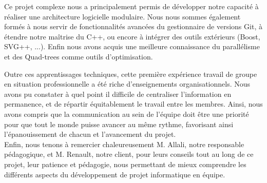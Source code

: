 \documentclass{style}
\begin{document}
Ce projet complexe nous a principalement permis de développer notre capacité à réaliser une architecture logicielle modulaire. Nous nous sommes également formés à nous servir de fonctionnalités avancées du gestionnaire de versions Git, à étendre notre maîtrise du C++, ou encore à intégrer des outils extérieurs (Boost, SVG++, ...). Enfin nous avons acquis une meilleure connaissance du parallélisme et des Quad-trees comme outils d'optimisation. 

Outre ces apprentissages techniques, cette première expérience travail de groupe en situation professionnelle a été riche d'enseignements organisationnels. Nous avons pu constater à quel point il difficile de centraliser l'information en permanence, et de répartir équitablement le travail entre les membres. Ainsi, nous avons compris que la communication au sein de l'équipe doit être une priorité pour que tout le monde puisse avancer au même rythme, favorisant ainsi l'épanouissement de chacun et l'avancement du projet. \\

Enfin, nous tenons à remercier chaleureusement M. Allali, notre responsable pédagogique, et M. Renault, notre client, pour leurs conseils tout au long de ce projet, leur patience et pédagogie, nous permettant de mieux comprendre les différents aspects du développement de projet informatique en équipe. 


\newpage
\newpage

%

\newpage

\end{document}
